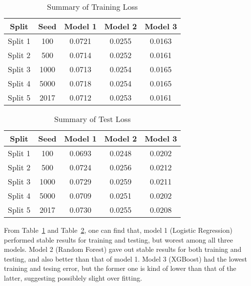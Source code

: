 \documentclass[12pt]{article}
\begin{document}
\begin{table}[htb]
 \caption{Summary of Training Loss} \label{result1}
 \vspace{0.1in}
\begin{center}
  \begin{tabular}{  c  c  c  c  c}
    \hline
    Split            & Seed        & Model 1    & Model 2    & Model 3 \\ \hline
    Split 1         & 100    &0.0721    &0.0255    &0.0163\\ \hline
    Split 2         & 500    &0.0714    &0.0252    &0.0161\\ \hline
    Split 3         & 1000    &0.0713    &0.0254    &0.0165\\ \hline
    Split 4         & 5000    &0.0718    &0.0254    &0.0165\\ \hline
    Split 5         & 2017    &0.0712    &0.0253    &0.0161\\ \hline
  \end{tabular}
\end{center}
\end{table}
\begin{table}[htb]
 \caption{Summary of Test Loss} \label{result2}
 \vspace{0.1in}
\begin{center}
  \begin{tabular}{  c  c  c  c  c}
    \hline
    Split            & Seed        & Model 1    & Model 2    & Model 3 \\ \hline
    Split 1         & 100    &0.0693    &0.0248    &0.0202\\ \hline
    Split 2         & 500    &0.0724    &0.0256    &0.0212\\ \hline
    Split 3         & 1000    &0.0729    &0.0259    &0.0211\\ \hline
    Split 4         & 5000    &0.0709    &0.0251    &0.0202\\ \hline
    Split 5         & 2017    &0.0730    &0.0255    &0.0208\\ \hline
  \end{tabular}
\end{center}
\end{table}


From Table~\ref{result1} and Table~\ref{result2}, one can find that, model 1 (Logistic Regression) performed stable results for training and testing, but worest among all three models. Model 2 (Random Forest) gave out stable results for both training and testing, and also better than that of model 1. Model 3 (XGBoost) had the lowest training and tesing error, but the former one is kind of lower than that of the latter, suggesting possiblely slight over fitting.
\end{document}
